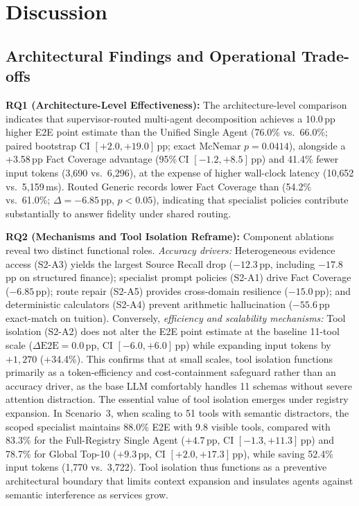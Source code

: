 \section{Discussion}
\label{sec:discussion}

\subsection{Architectural Findings and Operational Trade-offs}

\textbf{RQ1 (Architecture-Level Effectiveness):}
The architecture-level comparison indicates that supervisor-routed multi-agent decomposition achieves a 10.0\,pp higher E2E point estimate than the Unified Single Agent (76.0\% vs.\ 66.0\%; paired bootstrap CI $[+2.0, +19.0]$\,pp; exact McNemar $p{=}0.0414$), alongside a +3.58\,pp Fact Coverage advantage (95\%\,CI $[-1.2, +8.5]$\,pp) and 41.4\% fewer input tokens (3{,}690 vs.\ 6{,}296), at the expense of higher wall-clock latency (10{,}652 vs.\ 5{,}159\,ms). Routed Generic records lower Fact Coverage than \system{} (54.2\% vs.\ 61.0\%; $\Delta{=}-6.85$\,pp, $p{<}0.05$), indicating that specialist policies contribute substantially to answer fidelity under shared routing.

\textbf{RQ2 (Mechanisms and Tool Isolation Reframe):}
Component ablations reveal two distinct functional roles. \emph{Accuracy drivers:} Heterogeneous evidence access (S2-A3) yields the largest Source Recall drop ($-12.3$\,pp, including $-17.8$\,pp on structured finance); specialist prompt policies (S2-A1) drive Fact Coverage ($-6.85$\,pp); route repair (S2-A5) provides cross-domain resilience ($-15.0$\,pp); and deterministic calculators (S2-A4) prevent arithmetic hallucination ($-55.6$\,pp exact-match on tuition). Conversely, \emph{efficiency and scalability mechanisms:} Tool isolation (S2-A2) does not alter the E2E point estimate at the baseline 11-tool scale ($\Delta\text{E2E} = 0.0$\,pp, CI $[-6.0, +6.0]$\,pp) while expanding input tokens by $+1{,}270$ (+34.4\%). This confirms that at small scales, tool isolation functions primarily as a token-efficiency and cost-containment safeguard rather than an accuracy driver, as the base LLM comfortably handles 11 schemas without severe attention distraction.
The essential value of tool isolation emerges under registry expansion. In Scenario~3, when scaling to 51 tools with semantic distractors, the scoped specialist maintains 88.0\% E2E with 9.8 visible tools, compared with 83.3\% for the Full-Registry Single Agent ($+4.7$\,pp, CI $[-1.3, +11.3]$\,pp) and 78.7\% for Global Top-10 ($+9.3$\,pp, CI $[+2.0, +17.3]$\,pp), while saving 52.4\% input tokens (1{,}770 vs.\ 3{,}722). Tool isolation thus functions as a preventive architectural boundary that limits context expansion and insulates agents against semantic interference as services grow.

